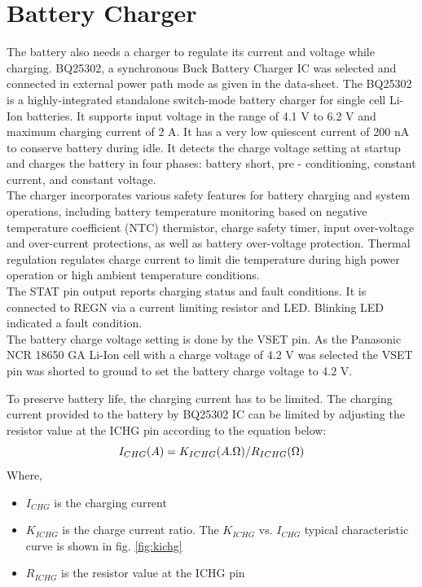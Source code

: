 \section[Battery Charger]{Battery Charger}
 The battery also needs a charger to regulate its current and voltage while charging.
 BQ25302, a synchronous Buck Battery Charger IC was selected and connected in external power path mode as given in the data-sheet. The BQ25302 is a highly-integrated standalone
 switch-mode battery charger for single cell Li-Ion batteries. It supports input voltage in the range of 4.1 V to 6.2 V and maximum charging current of 2 A. It has a very low quiescent current of 200 nA to conserve battery during idle.
 It detects the charge
 voltage setting at startup and charges the battery in four phases: battery short, pre - conditioning, constant
 current, and constant voltage. \\
 
 The charger incorporates various safety features for battery charging and system
 operations, including battery temperature monitoring based on negative temperature coefficient (NTC)
 thermistor, charge safety timer, input over-voltage and over-current protections, as well as battery over-voltage
 protection. Thermal regulation regulates charge current to limit die temperature during
 high power operation or high ambient temperature conditions.
 \\
 
 The STAT pin output reports charging status and fault conditions. It is connected to REGN via a current
 limiting resistor and LED. Blinking LED indicated a fault condition.\\
 
 The battery charge voltage setting is done by the VSET pin. As the Panasonic NCR 18650 GA Li-Ion cell with a charge voltage of 4.2 V was selected the VSET pin was shorted to ground to set the battery charge voltage to 4.2 V.
 
 
 To preserve battery life, the charging current has to be limited. The charging current provided to the battery by BQ25302 IC can be limited by adjusting the resistor value at the ICHG pin according to the equation below:
 \begin{equation}
 	I_{CHG} (A) = K_{ICHG} (A.\ohm) / R_{ICHG} (\ohm)
 	\label{eq:6.1}
 \end{equation}
 Where,
 \begin{itemize}
 	\item $I_{CHG}$ is the charging current
 	\item $K_{ICHG}$ is the charge current ratio.  The $K_{ICHG}$ vs.
 	$I_{CHG}$ typical characteristic curve is shown in fig. \ref{fig:kichg}
 	\item $R_{ICHG}$ is the resistor value at the ICHG pin 
 \end{itemize}
 
